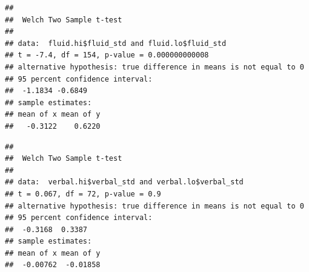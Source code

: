 \documentclass[
]{article}
\newenvironment{Shaded}{\begin{snugshade}}{\end{snugshade}}
\newcommand{\AttributeTok}[1]{\textcolor[rgb]{0.13,0.29,0.53}{#1}}
\newcommand{\ConstantTok}[1]{\textcolor[rgb]{0.56,0.35,0.01}{#1}}
\newcommand{\FloatTok}[1]{\textcolor[rgb]{0.00,0.00,0.81}{#1}}
\newcommand{\FunctionTok}[1]{\textcolor[rgb]{0.13,0.29,0.53}{\textbf{#1}}}
\newcommand{\NormalTok}[1]{#1}
\newcommand{\OtherTok}[1]{\textcolor[rgb]{0.56,0.35,0.01}{#1}}
\newcommand{\SpecialCharTok}[1]{\textcolor[rgb]{0.81,0.36,0.00}{\textbf{#1}}}
\newcommand{\StringTok}[1]{\textcolor[rgb]{0.31,0.60,0.02}{#1}}
\begin{document}
\begin{Shaded}
\end{Shaded}

\begin{verbatim}
## 
##  Welch Two Sample t-test
## 
## data:  fluid.hi$fluid_std and fluid.lo$fluid_std
## t = -7.4, df = 154, p-value = 0.000000000008
## alternative hypothesis: true difference in means is not equal to 0
## 95 percent confidence interval:
##  -1.1834 -0.6849
## sample estimates:
## mean of x mean of y 
##   -0.3122    0.6220
\end{verbatim}

\begin{Shaded}
\end{Shaded}

\begin{verbatim}
## 
##  Welch Two Sample t-test
## 
## data:  verbal.hi$verbal_std and verbal.lo$verbal_std
## t = 0.067, df = 72, p-value = 0.9
## alternative hypothesis: true difference in means is not equal to 0
## 95 percent confidence interval:
##  -0.3168  0.3387
## sample estimates:
## mean of x mean of y 
##  -0.00762  -0.01858
\end{verbatim}
\end{document}
